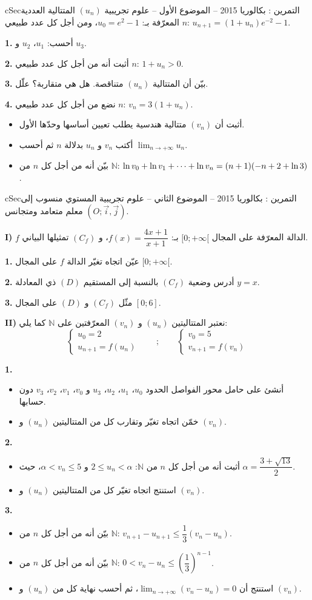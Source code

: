 \documentclass[12pt,a4paper]{article}
\newenvironment{BOX}[2]{\begin{otherlanguage}{english}\begin{arbox}{#1}{#2}}{\end{arbox}\end{otherlanguage}}
\newcounter{exo}
\newenvironment{tamrin}[1]{\stepcounter{exo}\begin{BOX}{cSec}{التمرين \theexo: #1}}{\end{BOX}}
\renewcommand{\cdots}{\mathinner{\cdotp\cdotp\cdotp}}
\newcommand{\N}{\mathbb{N}}
\newcommand{\limn}{\displaystyle\lim_{n\to+\infty}}
\newenvironment{sq}{\begin{itemize}[leftmargin=2.4em,itemsep=3pt]}{\end{itemize}}
\newcommand{\qa}{\item[(أ)]}\newcommand{\qb}{\item[(ب)]}\newcommand{\qc}{\item[(جـ)]}\newcommand{\qd}{\item[(د)]}\newcommand{\qe}{\item[(هـ)]}
\newcommand{\QQ}[1]{\par\smallskip\textbf{#1.} }
\begin{document}
\begin{tamrin}{بكالوريا 2015 -- الموضوع الأول -- علوم تجريبية}
$(u_n)$ المتتالية العددية المعرّفة بـ: $u_0=e^2-1$، ومن أجل كل عدد طبيعي $n$: $u_{n+1}=(1+u_n)e^{-2}-1$.
\QQ{1} أحسب: $u_1$، $u_2$ و $u_3$.
\QQ{2} أثبت أنه من أجل كل عدد طبيعي $n$: $1+u_n>0$.
\QQ{3} بيّن أن المتتالية $(u_n)$ متناقصة. هل هي متقاربة؟ علّل.
\QQ{4} نضع من أجل كل عدد طبيعي $n$: $v_n=3(1+u_n)$.
\begin{sq}
\qa أثبت أن $(v_n)$ متتالية هندسية يطلب تعيين أساسها وحدّها الأول.
\qb أكتب $v_n$ و $u_n$ بدلالة $n$ ثم أحسب $\limn u_n$.
\qc بيّن أنه من أجل كل $n$ من $\N$: $\ln v_0+\ln v_1+\cdots+\ln v_n=(n+1)(-n+2+\ln 3)$.
\end{sq}
\end{tamrin}

\begin{tamrin}{بكالوريا 2015 -- الموضوع الثاني -- علوم تجريبية}
المستوي منسوب إلى معلم متعامد ومتجانس $(O;\vec i,\vec j)$.

\textbf{I)} $f$ الدالة المعرّفة على المجال $[0;+\infty[$ بـ: $f(x)=\dfrac{4x+1}{x+1}$، و $(C_f)$ تمثيلها البياني.
\QQ{1} عيّن اتجاه تغيّر الدالة $f$ على المجال $[0;+\infty[$.
\QQ{2} أدرس وضعية $(C_f)$ بالنسبة إلى المستقيم $(D)$ ذي المعادلة $y=x$.
\QQ{3} مثّل $(C_f)$ و $(D)$ على المجال $[0;6]$.

\textbf{II)} نعتبر المتتاليتين $(u_n)$ و $(v_n)$ المعرّفتين على $\N$ كما يلي:
\[\begin{cases}u_0=2\\ u_{n+1}=f(u_n)\end{cases}\qquad;\qquad\begin{cases}v_0=5\\ v_{n+1}=f(v_n)\end{cases}\]
\QQ{1}
\begin{sq}
\qa أنشئ على حامل محور الفواصل الحدود $u_0$، $u_1$، $u_2$، $u_3$ و $v_0$، $v_1$، $v_2$، $v_3$ دون حسابها.
\qb خمّن اتجاه تغيّر وتقارب كل من المتتاليتين $(u_n)$ و $(v_n)$.
\end{sq}
\QQ{2}
\begin{sq}
\qa أثبت أنه من أجل كل $n$ من $\N$: $2\leqslant u_n<\alpha$ و $\alpha<v_n\leqslant 5$، حيث $\alpha=\dfrac{3+\sqrt{13}}{2}$.
\qb استنتج اتجاه تغيّر كل من المتتاليتين $(u_n)$ و $(v_n)$.
\end{sq}
\QQ{3}
\begin{sq}
\qa بيّن أنه من أجل كل $n$ من $\N$: $v_{n+1}-u_{n+1}\leqslant\dfrac13(v_n-u_n)$.
\qb بيّن أنه من أجل كل $n$ من $\N$: $0<v_n-u_n\leqslant\left(\dfrac13\right)^{n-1}$.
\qc استنتج أن $\limn(v_n-u_n)=0$، ثم أحسب نهاية كل من $(u_n)$ و $(v_n)$.
\end{sq}
\end{tamrin}
\end{document}
